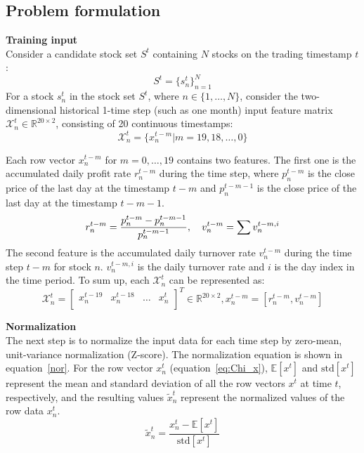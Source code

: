 \documentclass[preprint,12pt]{elsarticle}
\begin{document}
\subsection{Problem formulation}
\label{meth}
\textbf{Training input}\\
Consider a candidate stock set $S^t$ containing $N$ stocks on the trading timestamp $t$: 
$$S^{t} = \lbrace s^{t}_{n} \rbrace^{N}_{n=1}$$
For a stock $s_{n}^{t}$ in the stock set $S^t$, where $n \in \{1,\ldots, N\}$, consider the two-dimensional historical 1-time step (such as one month) input feature matrix $\mathcal{X}^t_n \in \mathbb{R}^{20\times2}$, consisting of 20 continuous timestamps: 
\begin{equation}
{\mathcal{X}}^{t} _{n} = \lbrace x^{t-m}_{n} \vert m = 19, 18, \dots, 0 \rbrace \label{eq:Chi_x}
\end{equation}


Each row vector $x_{n} ^{t-m}$ for $m = 0,\ldots,19$ contains two features. The first one is the accumulated daily profit rate $r^{t-m}_n$ during the time step, where $p^{t-m}_n$ is the close price of the last day at the timestamp $t-m$ and $p^{t-m-1}_n$ is the close price of the last day at the timestamp $t-m-1$. 
\begin{equation}
r^{t-m}_n = \frac{p^{t-m}_n - p^{t-m-1}_n}{p^{t-m-1}_n}, \quad v^{t-m}_n = \sum v^{t-m,i}_{n}
\label{r^{t}}
\end{equation}
The second feature is the accumulated daily turnover rate $v^{t-m}_n$ during the time step $t-m$ for stock $n$. $v^{t-m,i}_n$ is the daily turnover rate and $i$ is the day index in the time period. To sum up, each $\mathcal{X}^{t} _{n}$ can be represented as:
\begin{equation}
\mathcal{X}^{t} _{n} =
\left[
\begin{matrix}
x^{t-19}_n & x^{t-18}_n & \ldots & x^{t}_n \\
\end{matrix}
\right]^T \in \mathbb{R}^{20\times2}, x^{t-m}_n = [r^{t-m}_n, v^{t-m}_n]
\label{eq:Chi_rv}
\end{equation}

\textbf{Normalization}\\
The next step is to normalize the input data for each time step by zero-mean, unit-variance normalization (Z-score). The normalization equation is shown in equation~\eqref{nor}. 
For the row vector $x^t_n$ (equation~\eqref{eq:Chi_x}), $\mathbb{E}[x^{t}]$ and $\mathrm{std}[x^{t}]$ represent the mean and standard deviation of all the row vectors $x^{t}$ at time $t$, respectively, and the resulting values $\tilde{x} ^{t}_{n}$ represent the normalized values of the row data $x^{t}_{n}$.
\begin{equation}
    \tilde{x}^{t}_{n} = \frac{x ^{t}_n - \mathbb{E}[x^{t}]}{\mathrm{std}[x^{t}]}
    \label{nor}
\end{equation}
\end{document}

